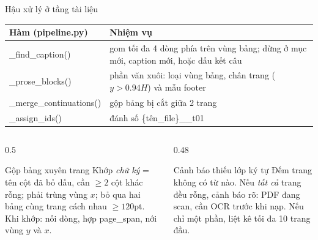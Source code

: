 \documentclass[aspectratio=169,11pt]{beamer}
\newcommand{\src}[1]{{\footnotesize\ttfamily #1}}
\begin{document}
\begin{frame}{Hậu xử lý ở tầng tài liệu}
  \begin{tabular}{@{}l p{}@{}}
    \toprule
    \textbf{Hàm (\src{pipeline.py})} & \textbf{Nhiệm vụ} \\
    \midrule
    \src{\_find\_caption()} & gom tối đa 4 dòng phía trên vùng bảng; dừng ở mục mới, caption mới, hoặc dấu kết câu \\
    \src{\_prose\_blocks()} & phần văn xuôi: loại vùng bảng, chân trang ($y>0.94H$) và mẫu footer \\
    \src{\_merge\_continuations()} & gộp bảng bị cắt giữa 2 trang \\
    \src{\_assign\_ids()} & đánh số \src{\{tên\_file\}\_\_t01} \\
    \bottomrule
  \end{tabular}
  \vspace{0.5em}
  \begin{columns}[T]
    \begin{column}{0.5\textwidth}
      \begin{block}{\small Gộp bảng xuyên trang}
        Khớp \emph{chữ ký} = tên cột đã bỏ dấu, cần $\ge 2$ cột khác rỗng;
        phải trùng vùng $x$; bỏ qua hai bảng cùng trang cách nhau $\ge 120$pt.
        Khi khớp: nối dòng, hợp \src{page\_span}, nới vùng $y$ và $x$.
      \end{block}
    \end{column}
    \begin{column}{0.48\textwidth}
      \begin{alertblock}{\small Cảnh báo thiếu lớp ký tự}
        Đếm trang không có từ nào. Nếu \emph{tất cả} trang đều rỗng, cảnh báo rõ:
        PDF đang scan, cần OCR trước khi nạp. Nếu chỉ một phần, liệt kê tối đa
        10 trang đầu.
      \end{alertblock}
    \end{column}
  \end{columns}
\end{frame}
\end{document}
